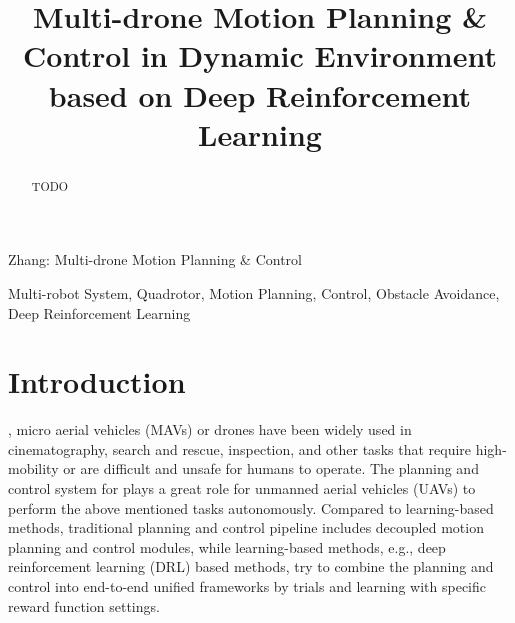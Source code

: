\documentclass[letterpaper,journal,twoside]{IEEEtran}
\begin{document}
\title{Multi-drone Motion Planning \& Control in Dynamic Environment based on Deep Reinforcement Learning}

\author{
}

\maketitle

\begingroup
\renewcommand\thefootnote{\textsuperscript{1}}
\endgroup

%
{Zhang: Multi-drone Motion Planning \& Control}



\begin{abstract}
TODO
\end{abstract}

\begin{IEEEkeywords}
  Multi-robot System, Quadrotor, Motion Planning, Control, 
  Obstacle Avoidance, Deep Reinforcement Learning
\end{IEEEkeywords}

\section{Introduction}
, micro aerial vehicles (MAVs) or 
drones have been widely used in cinematography, search and 
rescue, inspection, and other tasks that require 
high-mobility or are difficult and unsafe for humans to 
operate. 
The planning and control system for plays a great role for 
unmanned aerial vehicles (UAVs) to perform the 
above mentioned tasks autonomously.
Compared to learning-based methods, traditional planning 
and control pipeline includes decoupled 
motion planning and control modules, 
while learning-based methods, e.g., deep reinforcement 
learning (DRL) based methods, try to combine the planning 
and control into end-to-end unified frameworks by trials
and learning with specific reward function settings.
\end{document}
